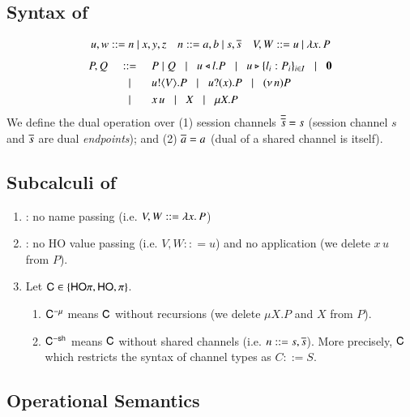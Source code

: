 \subsection{Syntax of \HOp}
\label{subsec:syntax}
\[ 
\begin{array}{lll}
u,w  ::=  n \ | \ x,y,z
& n ::= a,b  \ | \ s, \overline{s} 
& V,W  ::=   u \ | \ \lambda x.\,P
\end{array}
\]
\[
\begin{array}{rclllll}
P,Q & ::= &  P\;|\; Q \;\;\;|\;\;\; 
 u \triangleleft l . P \;\;\;|\;\;\; u \triangleright \{l_i:P_i\}_{i \in I} \;\;\;|\;\;\; \mathbf{0} \\[1mm]
  & \;\;\;|\;\;\; & u ! \langle V \rangle .{P} \;\;\;|\;\;\; u ? (x) .{P} \;\;\;|\;\;\; (\nu\, n) P \\[1mm]
      & \;\;\;|\;\;\; & x\, {u} \;\;\;|\;\;\; X \;\;\;|\;\;\; \mu X. P
\end{array}
\]
We define the dual operation over (1) session channels $\overline{\overline{s}} = s$
(session channel $s$ and $\overline{s}$ are dual \emph{endpoints}); and 
(2) $\overline{a} = a$ (dual of a shared channel is itself).  

\subsection{Subcalculi of \HOp}
\label{subsec:subcalculi}
\begin{enumerate}[$\bullet$]
\item \HO: no name passing (i.e. $V,W :: = \lambda x.\,P$)
\item \sessp: no HO value passing (i.e. $V,W :: = u$) and no application (we delete $x\, u$ from $P$). 
\item Let $\mathsf{C} \in \{\mathsf{HO}\pi, \mathsf{HO}, \pi\}$. 
\begin{enumerate}[-]
\item $\mathsf{C}^{-\mu}$ means 
$\mathsf{C}$ without recursions (we delete $\mu X.P$ and $X$ from $P$).   
\item 
$\mathsf{C}^{-\mathsf{sh}}$ means $\mathsf{C}$ without shared channels (i.e. 
$n ::= s, \overline{s}$). More precisely, $\mathsf{C}$ which restricts 
the syntax of channel types as $C::= S$.  
\end{enumerate}
\end{enumerate}

\subsection{Operational Semantics}
\label{subsec:semantics}


